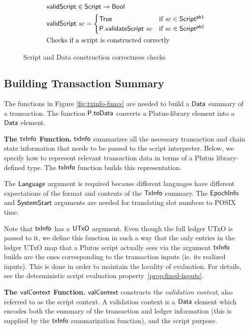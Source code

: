 \begin{figure*}[htb]
  \begin{align*}
    & \mathsf{validScript} \in \mathsf{Script} \to \mathsf{Bool} \\
    & \mathsf{validScript} ~sc = \begin{cases}
      \mathsf{True} & \text{if $sc \in \mathsf{Script^{ph1}}$} \\
      \mathsf{P.validateScript} ~sc & \text{if $sc \in \mathsf{Script^{ph2}}$}
    \end{cases} \\
    & \text{Checks if a script is constructed correctly}
  \end{align*}
  \caption{Script and Data construction correctness checks}
  \label{fig:data-script-check}
\end{figure*}

\subsection{Building Transaction Summary}

The functions in Figure \ref{fig:txinfo-funcs} are needed to build a $\mathsf{Data}$ summary of a transaction.
The function $\mathsf{P.toData}$ converts a Plutus-library element
into a $\mathsf{Data}$ element.

\textbf{The $\mathsf{txInfo}$ Function.}
$\mathsf{txInfo}$ summarizes all the necessary transaction and chain state information
    that needs to be passed to the script interpreter. Below, we specify how to
    represent relevant transaction data in terms of a Plutus
    library-defined type. The $\mathsf{txInfo}$ function builds this representation.

    The $\mathsf{Language}$ argument
    is required because different languages have different expectations of the
    format and contents of the $\mathsf{TxInfo}$ summary. The $\mathsf{EpochInfo}$ and $\mathsf{SystemStart}$
    arguments are needed for translating slot numbers to POSIX time.

    Note that $\mathsf{txInfo}$ has a $\mathsf{UTxO}$ argument. Even though the full ledger UTxO
    is passed to it, we define this function in such a way that the only
    entries in the ledger UTxO map that a Plutus script
    actually sees via the argument $\mathsf{txInfo}$ builds are the ones corresponding to the transaction
    inputs (ie. its realized inputs). This is done in order to maintain the locality of
    evaluation. For details, see the deterministic script evaluation property~\ref{prop:fixed-inputs}.

\textbf{The $\mathsf{valContext}$ Function.}
    $\mathsf{valContext}$ constructs the \emph{validation context}, also referred to as the
    script context. A validation context is
    a $\mathsf{Data}$ element which encodes both the summary of the transaction and ledger information
    (this is supplied by the $\mathsf{txInfo}$ summarization function), and the script purpose.

